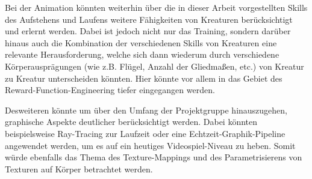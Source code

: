 Bei der Animation könnten weiterhin über die in dieser Arbeit vorgestellten Skills des Aufstehens und Laufens weitere Fähigkeiten von Kreaturen berücksichtigt und erlernt werden. Dabei ist jedoch nicht nur das Training, sondern darüber hinaus auch die Kombination der verschiedenen Skills von Kreaturen eine relevante Herausforderung, welche sich dann wiederum durch verschiedene Körperausprägungen (wie z.B. Flügel, Anzahl der Gliedmaßen, etc.) von Kreatur zu Kreatur unterscheiden könnten. Hier könnte vor allem in das Gebiet des Reward-Function-Engineering tiefer eingegangen werden.

Desweiteren könnte um über den Umfang der Projektgruppe hinauszugehen, graphische Aspekte deutlicher berücksichtigt werden. Dabei könnten beispielsweise Ray-Tracing zur Laufzeit oder eine Echtzeit-Graphik-Pipeline angewendet werden, um es auf ein heutiges Videospiel-Niveau zu heben. Somit würde ebenfalls das Thema des Texture-Mappings und des Parametrisierens von Texturen auf Körper betrachtet werden.


